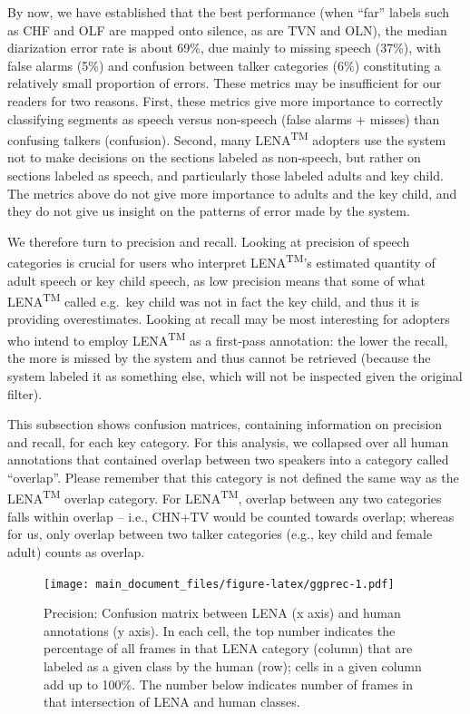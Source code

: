 \documentclass[english,floatsintext,man]{apa6}
\begin{document}
By now, we have established that the best performance (when
\enquote{far} labels such as CHF and OLF are mapped onto silence, as are
TVN and OLN), the median diarization error rate is about 69\%, due
mainly to missing speech (37\%), with false alarms (5\%) and confusion
between talker categories (6\%) constituting a relatively small
proportion of errors. These metrics may be insufficient for our readers
for two reasons. First, these metrics give more importance to correctly
classifying segments as speech versus non-speech (false alarms + misses)
than confusing talkers (confusion). Second, many
LENA\textsuperscript{TM} adopters use the system not to make decisions
on the sections labeled as non-speech, but rather on sections labeled as
speech, and particularly those labeled adults and key child. The metrics
above do not give more importance to adults and the key child, and they
do not give us insight on the patterns of error made by the system.

We therefore turn to precision and recall. Looking at precision of
speech categories is crucial for users who interpret
LENA\textsuperscript{TM}'s estimated quantity of adult speech or key
child speech, as low precision means that some of what
LENA\textsuperscript{TM} called e.g.~key child was not in fact the key
child, and thus it is providing overestimates. Looking at recall may be
most interesting for adopters who intend to employ
LENA\textsuperscript{TM} as a first-pass annotation: the lower the
recall, the more is missed by the system and thus cannot be retrieved
(because the system labeled it as something else, which will not be
inspected given the original filter).

This subsection shows confusion matrices, containing information on
precision and recall, for each key category. For this analysis, we
collapsed over all human annotations that contained overlap between two
speakers into a category called \enquote{overlap}. Please remember that
this category is not defined the same way as the
LENA\textsuperscript{TM} overlap category. For LENA\textsuperscript{TM},
overlap between any two categories falls within overlap -- i.e., CHN+TV
would be counted towards overlap; whereas for us, only overlap between
two talker categories (e.g., key child and female adult) counts as
overlap.

\begin{figure}
\centering
\texttt{[image: main\_document\_files/figure-latex/ggprec-1.pdf]}
\caption{\label{fig:ggprec}Precision: Confusion matrix between LENA (x axis)
and human annotations (y axis). In each cell, the top number indicates
the percentage of all frames in that LENA category (column) that are
labeled as a given class by the human (row); cells in a given column add
up to 100\%. The number below indicates number of frames in that
intersection of LENA and human classes.}
\end{figure}
\end{document}
